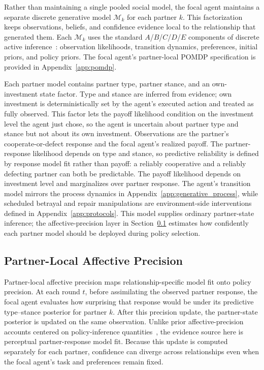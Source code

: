 \documentclass[runningheads,orivec]{llncs}
\begin{document}
Rather than maintaining a single pooled social model, the focal agent maintains a separate discrete generative model $\mathcal{M}_k$ for each partner $k$. This factorization keeps observations, beliefs, and confidence evidence local to the relationship that generated them. Each $\mathcal{M}_k$ uses the standard $A$/$B$/$C$/$D$/$E$ components of discrete active inference~\cite{DaCosta2020DiscreteSynthesis}: observation likelihoods, transition dynamics, preferences, initial priors, and policy priors. The focal agent's partner-local POMDP specification is provided in Appendix~\ref{app:pomdp}.

Each partner model contains partner type, partner stance, and an own-investment state factor. Type and stance are inferred from evidence; own investment is deterministically set by the agent's executed action and treated as fully observed. This factor lets the payoff likelihood condition on the investment level the agent just chose, so the agent is uncertain about partner type and stance but not about its own investment. Observations are the partner's cooperate-or-defect response and the focal agent's realized payoff. The partner-response likelihood depends on type and stance, so predictive reliability is defined by response model fit rather than payoff: a reliably cooperative and a reliably defecting partner can both be predictable. The payoff likelihood depends on investment level and marginalizes over partner response. The agent's transition model mirrors the process dynamics in Appendix~\ref{app:generative_process}, while scheduled betrayal and repair manipulations are environment-side interventions defined in Appendix~\ref{app:protocols}. This model supplies ordinary partner-state inference; the affective-precision layer in Section~\ref{sec:affective_precision} estimates how confidently each partner model should be deployed during policy selection.

\subsection{Partner-Local Affective Precision}
\label{sec:affective_precision}

Partner-local affective precision maps relationship-specific model fit onto policy precision. At each round \(t\), before assimilating the observed partner response, the focal agent evaluates how surprising that response would be under its predictive type--stance posterior for partner \(k\). After this precision update, the partner-state posterior is updated on the same observation. Unlike prior affective-precision accounts centered on policy-inference quantities~\cite{Hesp2021DeeplyFeltAffect}, the evidence source here is perceptual partner-response model fit. Because this update is computed separately for each partner, confidence can diverge across relationships even when the focal agent's task and preferences remain fixed.
\end{document}
